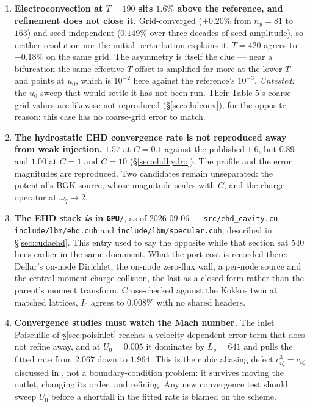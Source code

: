 \documentclass[11pt,a4paper]{article}
\newcommand{\code}[1]{\texttt{\small #1}}
\begin{document}
\begin{enumerate}[leftmargin=1.4em,itemsep=4pt]
\item \textbf{Electroconvection at $T=190$ sits $1.6\%$ above the reference,
  and refinement does not close it.} Grid-converged ($+0.20\%$ from $n_y=81$ to
  $163$) and seed-independent ($0.149\%$ over three decades of seed amplitude),
  so neither resolution nor the initial perturbation explains it. $T=420$ agrees
  to $-0.18\%$ on the same grid. The asymmetry is itself the clue --- near a
  bifurcation the same effective-$T$ offset is amplified far more at the lower
  $T$ --- and points at $u_0$, which is $10^{-2}$ here against the reference's
  $10^{-3}$. \emph{Untested:} the $u_0$ sweep that would settle it has not been
  run. Their Table 5's coarse-grid values are likewise not reproduced
  (\S\ref{sec:ehdconv}), for the opposite reason: this case has no coarse-grid
  error to match.

\item \textbf{The hydrostatic EHD convergence rate is not reproduced away from
  weak injection.} $1.57$ at $C=0.1$ against the published $1.6$, but $0.89$ and
  $1.00$ at $C=1$ and $C=10$ (\S\ref{sec:ehdhydro}). The profile and the error
  magnitudes are reproduced. Two candidates remain unseparated: the potential's
  BGK source, whose magnitude scales with $C$, and the charge operator at
  $\omega_q\to2$.

\item \textbf{The EHD stack \emph{is} in \code{GPU/}}, as of 2026-09-06 ---
  \code{src/ehd\_cavity.cu}, \code{include/lbm/ehd.cuh} and
  \code{include/lbm/specular.cuh}, described in \S\ref{sec:cudaehd}. This entry
  used to say the opposite while that section sat 540 lines earlier in the same
  document. What the port cost is recorded there: Dellar's on-node Dirichlet, the
  on-node zero-flux wall, a per-node source and the central-moment charge
  collision, the last as a closed form rather than the parent's moment transform.
  Cross-checked against the Kokkos twin at matched lattices, $I_0$ agrees to
  $0.008\%$ with no shared headers.

\item \textbf{Convergence studies must watch the Mach number.} The inlet
Poiseuille of \S\ref{sec:poisinlet} reaches a velocity-dependent error term
that does not refine away, and at $U_0 = 0.005$ it dominates by $L_y = 641$ and
pulls the fitted rate from $2.067$ down to $1.964$. This is the cubic aliasing
defect $c_{i\zeta}^3 = c_{i\zeta}$ discussed in \cite{derosis2020}, not a
boundary-condition problem: it survives moving the outlet, changing its order,
and refining. Any new convergence test should sweep $U_0$ before a shortfall in
the fitted rate is blamed on the scheme.


\end{enumerate}
\end{document}
